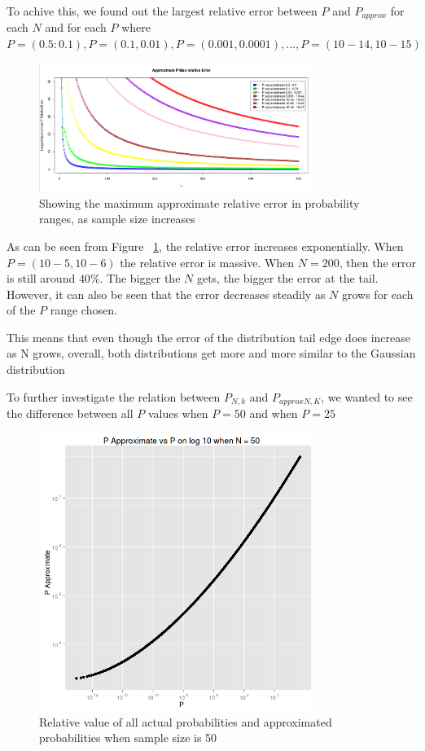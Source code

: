 \documentclass[12pt]{article}
\begin{document}
To achive this, we found out the largest relative error between $P$ and $P_{approx}$ for each $N$ and for each $P$ where $P = (0.5:0.1), P = (0.1, 0.01), P = (0.001, 0.0001), ... , P = (10-14 , 10-15)$

\begin{figure}
	\centering
  \includegraphics[width=0.8\textwidth]{LargestApproxPRelativeError3}
	\caption{Showing the maximum approximate relative error in probability ranges, as sample size increases}
	\label{fig:LargestApproxPRelativeError}
\end{figure}

As can be seen from Figure ~\ref{fig:LargestApproxPRelativeError}, the relative error increases exponentially. When $P = (10-5 , 10-6)$ the relative error is massive. When $N=200$, then the error is still around $40\%$. The bigger the $N$ gets, the bigger the error at the tail. However, it can also be seen that the error decreases steadily as $N$ grows for each of the $P$ range chosen.

This means that even though the error of the distribution tail edge does increase as N grows, overall, both distributions get more and more similar to the Gaussian distribution

To further investigate the relation between $P_{N, k}$ and $P_{approx N, K}$, we wanted to see the difference between all $P$ values when $P = 50$ and when $P = 25$

\begin{figure}
	\centering
  \includegraphics[width=0.8\textwidth]{PvsP50}
	\caption{Relative value of all actual probabilities and approximated probabilities when sample size is 50}
	\label{fig:PvsP50}
\end{figure}
\end{document}
